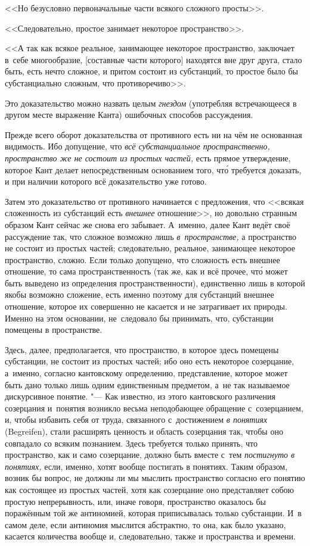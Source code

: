 <<Но безусловно первоначальные части всякого сложного просты>>.

<<Следовательно, простое занимает некоторое пространство>>.

<<А так как всякое реальное, занимающее некоторое пространство, заключает
в~себе многообразие, [составные части которого] находятся вне друг друга,
стало быть, есть нечто сложное, и притом состоит из субстанций, то простое
было бы субстанциально сложным, что противоречиво>>.

Это доказательство можно назвать целым {\em гнездом} (употребляя встречающееся
в другом месте выражение Канта) ошибочных способов рассуждения.

Прежде всего оборот доказательства от противного есть ни на чём не основанная
видимость. Ибо допущение, что {\em всё субстанциальное пространственно,
пространство же не состоит из простых частей,} есть прямое утверждение,
которое Кант делает непосредственным основанием того, чт\'{о} требуется
доказать, и при наличии которого всё доказательство уже готово.

Затем это доказательство от противного начинается с предложения, что <<всякая
сложенность из субстанций есть {\em внешнее} отношение>>, но довольно странным
образом Кант сейчас же снова его забывает. А~именно, далее Кант ведёт своё
рассуждение так, что сложное возможно лишь {\em в~пространстве,} а пространство
не состоит из простых частей; следовательно, реальное, занимающее некоторое
пространство, сложно. Если только допущено, что сложность есть внешнее
отношение, то сама пространственность (так же, как и всё прочее, чт\'{о} может
быть выведено из определения пространственности), единственно лишь в которой
якобы возможно сложение, есть именно поэтому для субстанций внешнее отношение,
которое их совершенно не касается и не затрагивает их природы. Именно на этом
основании, не~следовало бы принимать, что, субстанции помещены в пространстве.

Здесь, далее, предполагается, что пространство, в которое здесь помещены
субстанции, не состоит из простых частей; ибо оно есть некоторое созерцание,
а~именно, согласно кантовскому определению, представление, которое может быть
дано только лишь одним единственным предметом, а~не так называемое дискурсивное
понятие. "--- Как известно, из этого кантовского различения созерцания
и~понятия возникло весьма неподобающее обращение с~созерцанием, и, чтобы
избавить себя от труда, связанного с~достижением {\em в понятиях} (Begreifen),
стали расширять ценность и область созерцания так, чтобы оно совпадало со
всяким познанием. Здесь требуется только принять, что пространство, как и само
созерцание, должно быть вместе с~тем {\em постигнуто в понятиях,} если, именно,
хотят вообще постигать в понятиях. Таким образом, возник бы вопрос, не должны
ли мы мыслить пространство согласно его понятию как состоящее из простых
частей, хотя как созерцание оно представляет собою простую непрерывность, или,
иначе говоря, пространство оказалось бы поражённым той же антиномией, которая
приписывалась только субстанции. И~в самом деле, если антиномия мыслится
абстрактно, то она, как было указано, касается количества вообще и,
следовательно, также и пространства и времени.

